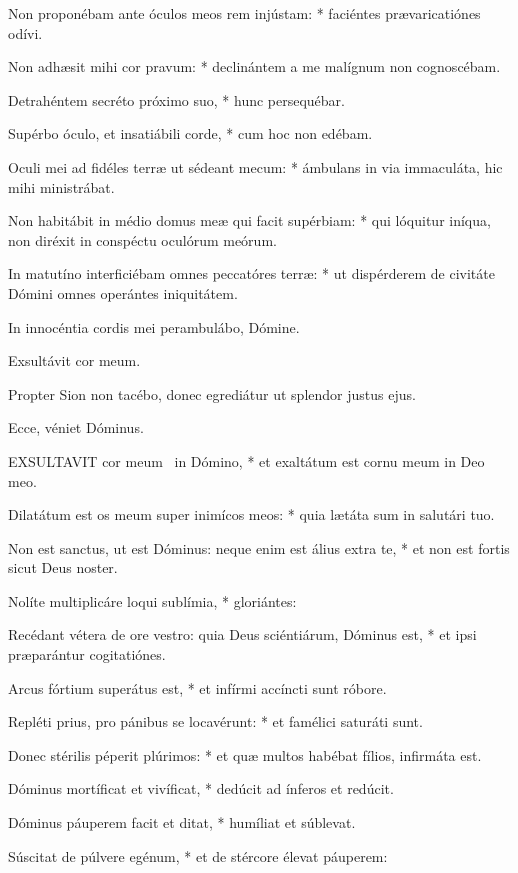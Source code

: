 Non proponébam ante óculos meos rem injústam: * faciéntes prævaricatiónes odívi.

Non adhæsit mihi cor pravum: * declinántem a me malígnum non cognoscébam.

Detrahéntem secréto próximo suo, * hunc persequébar.

Supérbo óculo, et insatiábili corde, * cum hoc non edébam.

Oculi mei ad fidéles terræ ut sédeant mecum: * ámbulans in via immaculáta, hic mihi ministrábat.

Non habitábit in médio domus meæ qui facit supérbiam: * qui lóquitur iníqua, non diréxit in conspéctu oculórum meórum.

In matutíno interficiébam omnes peccatóres terræ: * ut dispérderem de civitáte Dómini omnes operántes iniquitátem.

 In innocéntia cordis mei perambulábo, Dómine.

 Exsultávit cor meum. \textdagger

  Propter Sion non tacébo, donec egrediátur ut splendor justus ejus.

 Ecce, véniet Dóminus.


\lettrine[lines=2]{E}{XSULTAVIT} cor meum \textdagger\ in Dómino, * et exaltátum est cornu meum in Deo meo.

Dilatátum est os meum super inimícos meos: * quia lætáta sum in salutári tuo.

Non est sanctus, ut est Dóminus: neque enim est álius extra te, * et non est fortis sicut Deus noster.

Nolíte multiplicáre loqui sublímia, * gloriántes:

Recédant vétera de ore vestro: quia Deus sciéntiárum, Dóminus est, * et ipsi præparántur cogitatiónes.

Arcus fórtium superátus est, * et infírmi accíncti sunt róbore.

Repléti prius, pro pánibus se locavérunt: * et famélici saturáti sunt.

Donec stérilis péperit plúrimos: * et quæ multos habébat fílios, infirmáta est.

Dóminus mortíficat et vivíficat, * dedúcit ad ínferos et redúcit.

Dóminus páuperem facit et ditat, * humíliat et súblevat.

Súscitat de púlvere egénum, * et de stércore élevat páuperem:

